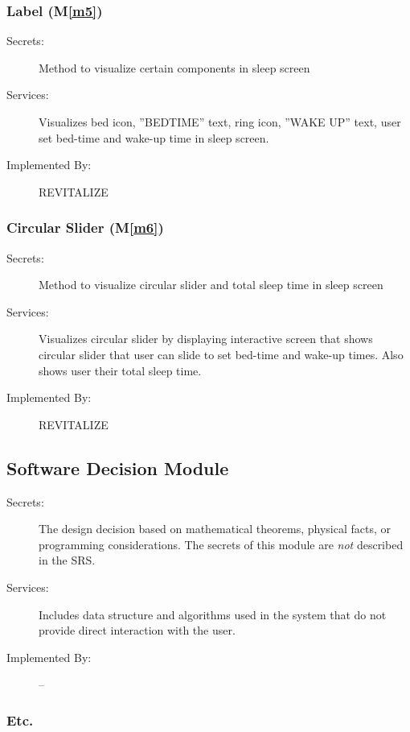 \documentclass[12pt, titlepage]{article}
\newcommand{\mref}[1]{M\ref{#1}}
\begin{document}
\subsubsection{Label (\mref{m5})}
\begin{description}
	\item[Secrets:]Method to visualize certain components in sleep screen
	\item[Services:]Visualizes bed icon, ”BEDTIME” text, ring icon, ”WAKE UP” text, user set bed-time and wake-up time in sleep screen.
	\item[Implemented By:] REVITALIZE
\end{description}

\subsubsection{Circular Slider (\mref{m6})}
\begin{description}
	\item[Secrets:]Method to visualize circular slider and total sleep time in sleep screen
	\item[Services:]Visualizes circular slider by displaying interactive screen that shows circular slider that user can slide to set bed-time and wake-up times. Also shows user their total sleep time.
	\item[Implemented By:] REVITALIZE
\end{description}


\subsection{Software Decision Module}

\begin{description}
	\item[Secrets:] The design decision based on mathematical theorems, physical
	facts, or programming considerations. The secrets of this module are
	\emph{not} described in the SRS.
	\item[Services:] Includes data structure and algorithms used in the system that
	do not provide direct interaction with the user. 
	\item[Implemented By:] --
\end{description}

\subsubsection{Etc.}
\end{document}
